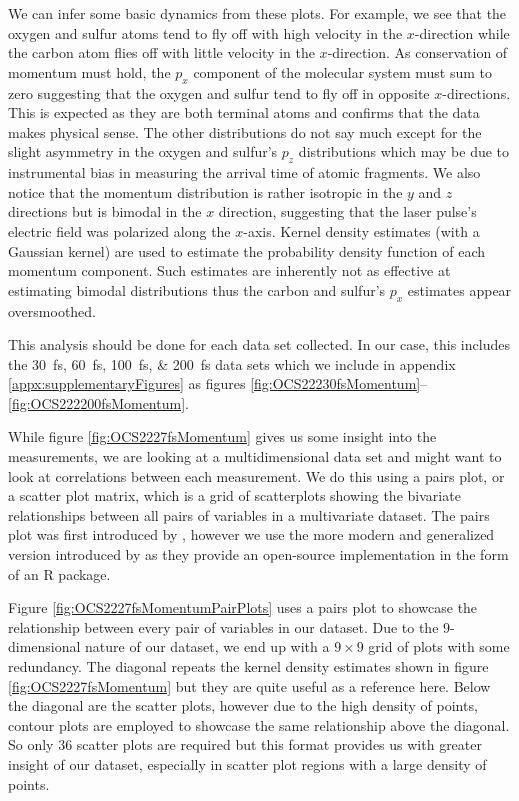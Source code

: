 We can infer some basic dynamics from these plots. For example, we see that the oxygen and sulfur atoms tend to fly off with high velocity in the $x$-direction while the carbon atom flies off with little velocity in the $x$-direction. As conservation of momentum must hold, the $p_x$ component of the molecular system must sum to zero suggesting that the oxygen and sulfur tend to fly off in opposite $x$-directions. This is expected as they are both terminal atoms and confirms that the data makes physical sense. The other distributions do not say much except for the slight asymmetry in the oxygen and sulfur's $p_z$ distributions which may be due to instrumental bias in measuring the arrival time of atomic fragments. We also notice that the momentum distribution is rather isotropic in the $y$ and $z$ directions but is bimodal in the $x$ direction, suggesting that the laser pulse's electric field was polarized along the $x$-axis. Kernel density estimates (with a Gaussian kernel) are used to estimate the probability density function of each momentum component. Such estimates are inherently not as effective at estimating bimodal distributions thus the carbon and sulfur's $p_x$ estimates appear oversmoothed.

This analysis should be done for each data set collected. In our case, this includes the \SIlist{30;60;100;200}{\fs} data sets which we include in appendix \ref{appx:supplementaryFigures} as figures \ref{fig:OCS22230fsMomentum}--\ref{fig:OCS222200fsMomentum}.

While figure \ref{fig:OCS2227fsMomentum} gives us some insight into the measurements, we are looking at a multidimensional data set and might want to look at correlations between each measurement. We do this using a pairs plot, or a scatter plot matrix, which is a grid of scatterplots showing the bivariate relationships between all pairs of variables in a multivariate dataset. The pairs plot was first introduced by \citet{Hartigan75}, however we use the more modern and generalized version introduced by \citet{Emerson13} as they provide an open-source implementation in the form of an R package.

Figure \ref{fig:OCS2227fsMomentumPairPlots} uses a pairs plot to showcase the relationship between every pair of variables in our dataset. Due to the $9$-dimensional nature of our dataset, we end up with a $9\times9$ grid of plots with some redundancy. The diagonal repeats the kernel density estimates shown in figure \ref{fig:OCS2227fsMomentum} but they are quite useful as a reference here. Below the diagonal are the scatter plots, however due to the high density of points, contour plots are employed to showcase the same relationship above the diagonal. So only 36 scatter plots are required but this format provides us with greater insight of our dataset, especially in scatter plot regions with a large density of points.

